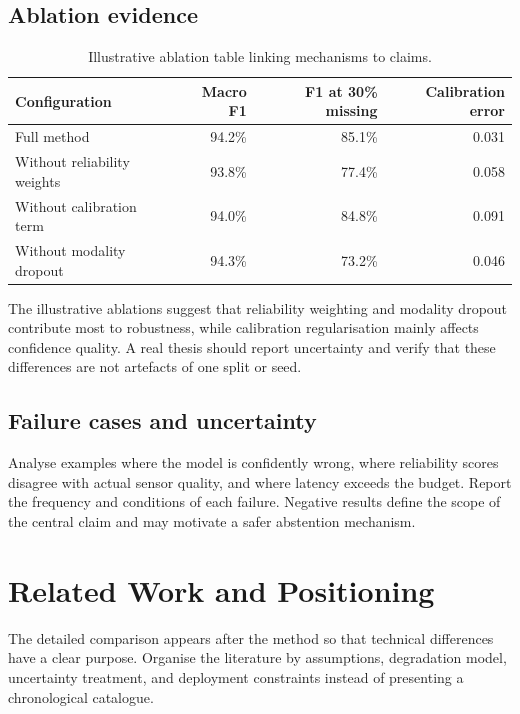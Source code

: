 \section{Ablation evidence}
\begin{table}[htbp]
\centering
\caption{Illustrative ablation table linking mechanisms to claims.}
\label{tab:m-ablation}
\begin{tabularx}{0.88\textwidth}{Yrrr}
\toprule
Configuration & Macro F1 & F1 at 30\% missing & Calibration error\\
\midrule
Full method & 94.2\% & 85.1\% & 0.031\\
Without reliability weights & 93.8\% & 77.4\% & 0.058\\
Without calibration term & 94.0\% & 84.8\% & 0.091\\
Without modality dropout & 94.3\% & 73.2\% & 0.046\\
\bottomrule
\end{tabularx}
\end{table}

\begin{resultbox}
The illustrative ablations suggest that reliability weighting and modality dropout contribute most to robustness, while calibration regularisation mainly affects confidence quality. A real thesis should report uncertainty and verify that these differences are not artefacts of one split or seed.
\end{resultbox}

\section{Failure cases and uncertainty}
Analyse examples where the model is confidently wrong, where reliability scores disagree with actual sensor quality, and where latency exceeds the budget. Report the frequency and conditions of each failure. Negative results define the scope of the central claim and may motivate a safer abstention mechanism.

\chapter{Related Work and Positioning}\label{ch:m-related}
The detailed comparison appears after the method so that technical differences have a clear purpose. Organise the literature by assumptions, degradation model, uncertainty treatment, and deployment constraints instead of presenting a chronological catalogue.

